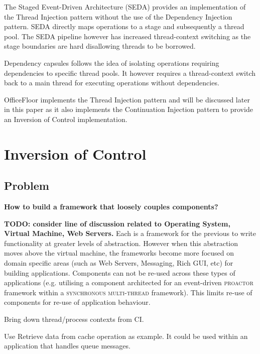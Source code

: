\documentclass[prodmode]{style/acmlarge}
\begin{document}
The Staged Event-Driven Architecture (SEDA) \cite{seda} provides an
implementation of the Thread Injection pattern without the use of the Dependency
Injection pattern.  SEDA directly maps operations to a stage and subsequently a
thread pool.  The SEDA pipeline however has increased thread-context switching
as the stage boundaries are hard disallowing threads to be borrowed.

Dependency capsules \cite{dependency-capsules} follows the idea of isolating
operations requiring dependencies to specific thread pools.  It however requires
a thread-context switch back to a main thread for executing operations without
dependencies.

OfficeFloor \cite{officefloor} implements the Thread Injection pattern and will
be discussed later in this paper as it also implements the Continuation
Injection pattern to provide an Inversion of Control implementation.



\section{Inversion of Control}


\subsection{Problem}

\textbf{How to build a framework that loosely couples components?}

\textbf{TODO: consider line of discussion related to Operating System, Virtual
Machine, Web Servers.} Each is a framework for the previous to write
functionality at greater levels of abstraction.  However when this abstraction
moves above the virtual machine, the frameworks become more focused on domain
specific areas (such as Web Servers, Messaging, Rich GUI, etc) for building
applications.  Components can not be re-used across these types of applications
(e.g. utilising a component architected for an event-driven \textsc{proactor}
framework within a \textsc{synchronous multi-thread} framework).  This limits
re-use of components for re-use of application behaviour.

Bring down thread/process contexts from CI.

Use Retrieve data from cache operation as example.  It could be used within an
application that handles queue messages.
\end{document}
